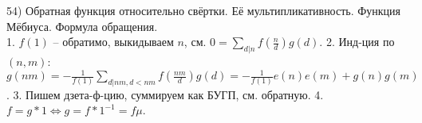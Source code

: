﻿54) Обратная функция относительно свёртки. Её мультипликативность. Функция Мёбиуса. Формула обращения.\\
1. $f(1)$ -- обратимо, выкидываем $n$, см. $0=\sum_{d|n}f(\frac{n}{d})g(d)$. 2. Инд-ция по $(n, m)$: $g(nm)=-\frac{1}{f(1)}\sum_{d|nm, d<nm}f(\frac{nm}{d})g(d)=-\frac{1}{f(1)}e(n)e(m)+g(n)g(m)$. 3. Пишем дзета-ф-цию, суммируем как БУГП, см. обратную. 4. $f=g*1 \Leftrightarrow g=f*1^{-1}=f\mu$.\\